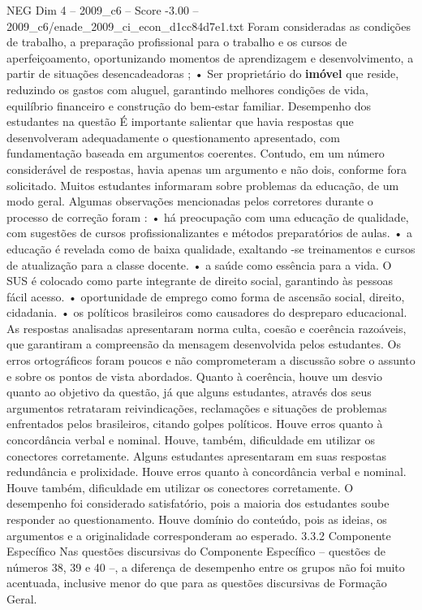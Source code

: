 \begin{textsample}{NEG Dim 4 – 2009\_c6 – Score -3.00 – 2009\_c6/enade\_2009\_ci\_econ\_d1cc84d7e1.txt}
Foram consideradas as condições de trabalho, a preparação profissional para o trabalho e os cursos de aperfeiçoamento, oportunizando momentos de aprendizagem e desenvolvimento, a partir de situações desencadeadoras ; • Ser proprietário do \textbf{imóvel} que reside, reduzindo os gastos com aluguel, garantindo melhores condições de vida, equilíbrio financeiro e construção do bem-estar familiar.
Desempenho dos estudantes na questão É importante salientar que havia respostas que desenvolveram adequadamente o questionamento apresentado, com fundamentação baseada em argumentos coerentes.
Contudo, em um número considerável de respostas, havia apenas um argumento e não dois, conforme fora solicitado.
Muitos estudantes informaram sobre problemas da educação, de um modo geral.
Algumas observações mencionadas pelos corretores durante o processo de correção foram : • há preocupação com uma educação de qualidade, com sugestões de cursos profissionalizantes e métodos preparatórios de aulas. • a educação é revelada como de baixa qualidade, exaltando -se treinamentos e cursos de atualização para a classe docente. • a saúde como essência para a vida.
O SUS é colocado como parte integrante de direito social, garantindo às pessoas fácil acesso. • oportunidade de emprego como forma de ascensão social, direito, cidadania. • os políticos brasileiros como causadores do despreparo educacional.
As respostas analisadas apresentaram norma culta, coesão e coerência razoáveis, que garantiram a compreensão da mensagem desenvolvida pelos estudantes.
Os erros ortográficos foram poucos e não comprometeram a discussão sobre o assunto e sobre os pontos de vista abordados.
Quanto à coerência, houve um desvio quanto ao objetivo da questão, já que alguns estudantes, através dos seus argumentos retrataram reivindicações, reclamações e situações de problemas enfrentados pelos brasileiros, citando golpes políticos.
Houve erros quanto à concordância verbal e nominal.
Houve, também, dificuldade em utilizar os conectores corretamente.
Alguns estudantes apresentaram em suas respostas redundância e prolixidade.
Houve erros quanto à concordância verbal e nominal.
Houve também, dificuldade em utilizar os conectores corretamente.
O desempenho foi considerado satisfatório, pois a maioria dos estudantes soube responder ao questionamento.
Houve domínio do conteúdo, pois as ideias, os argumentos e a originalidade corresponderam ao esperado. 3.3.2 Componente Específico Nas questões discursivas do Componente Específico – questões de números 38, 39 e 40 –, a diferença de desempenho entre os grupos não foi muito acentuada, inclusive menor do que para as questões discursivas de Formação Geral.

\end{textsample}
